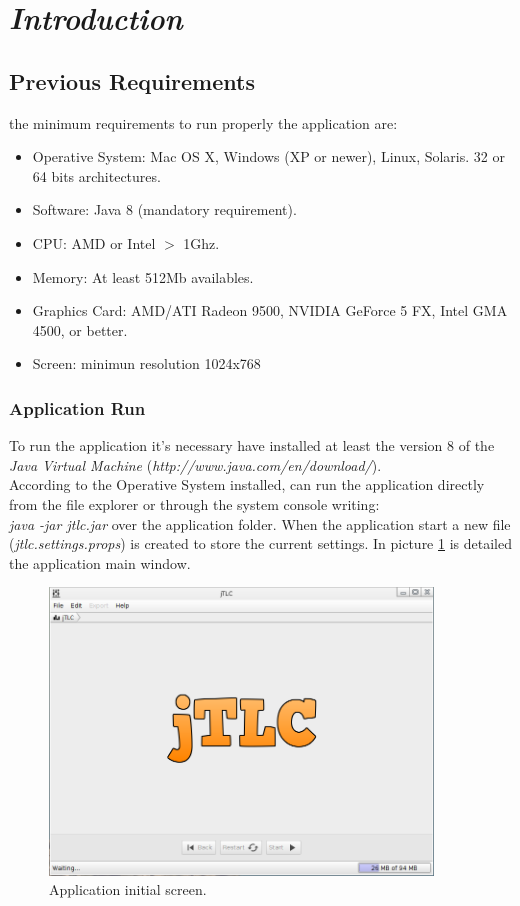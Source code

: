 \chapter*{\textit{Introduction}}
\section*{Previous Requirements}
the minimum requirements to run properly the application are:
\begin{itemize} \itemsep0pt \parskip0pt 
	\renewcommand{\labelitemi}{$\rightarrow$}
	\item Operative System: Mac OS X, Windows (XP or newer), Linux, Solaris. 32 or 64 bits architectures.
	\item Software: Java 8 (mandatory requirement).
	\item CPU: AMD or Intel {$>$} 1Ghz.
	\item Memory: At least 512Mb availables.
	\item Graphics Card: AMD/ATI Radeon 9500, NVIDIA GeForce 5 FX, Intel GMA 4500, or better.
	\item Screen: minimun resolution 1024x768
\end{itemize}

\subsection*{Application Run}
To run the application it's necessary have installed at least the version 8 of the \textit{Java Virtual Machine} (\emph{http://www.java.com/en/download/}).\\
According to the Operative System installed, can run the application directly from the file explorer or through the system console writing:\\ \emph{java -jar jtlc.jar} over the application folder.
When the application start a new file (\textit{jtlc.settings.props}) is created to store the current settings.
In picture \ref{fig:inicial} is detailed  the application main window.

\begin{figure}[H]
	\vspace{-1cm}
	\centering
	\includegraphics[width=385px]{imagenes/main}
	\centering
	\vspace{-0.4cm}
	\caption{Application initial screen.}
	\label{fig:inicial}
	\vspace{-0.25cm}
\end{figure}

